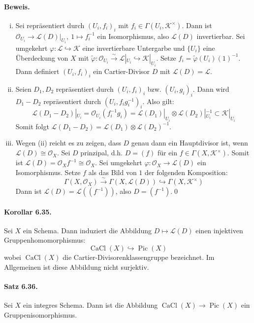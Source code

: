 \paragraph{Beweis.} \begin{enumerate}[(i)]
\item Sei repräsentiert durch $(U_i,f_i)_i$ mit $f_i\in\Gamma(U_i,\mathcal{K}^\times)$. Dann ist $\mathcal{O}_{U_i}\to\mathcal{L}(D)|_{U_i},\ 1\mapsto f_i^{-1}$ ein Isomorphismus, also $\mathcal{L}(D)$ invertierbar. Sei umgekehrt $\varphi:\mathcal{L}\hookrightarrow\mathcal{K}$ eine invertierbare Untergarbe und $\{U_i\}$ eine Überdeckung von $X$ mit $\tilde{\varphi}:\mathcal{O}_{U_i}\stackrel{\sim}{\to}\mathcal{L}|_{U_i}\hookrightarrow\mathcal{K}|_{U_i}$. Setze $f_i=\tilde{\varphi}(U_i)(1)^{-1}$. Dann definiert $(U_i,f_i)_i$ ein Cartier-Divisor $D$ mit $\mathcal{L}(D)=\mathcal{L}$.
\item Seien $D_1, D_2$ repräsentiert durch $(U_i,f_i)_i$ bzw. $(U_i,g_i)_i$. Dann wird $D_1-D_2$ repräsentiert durch $(U_i,f_ig_i^{-1})_i$. Also gilt:
\[\mathcal{L}(D_1-D_2)|_{U_i}=\mathcal{O}_{U_i}(f_i^{-1}g_i)=\mathcal{L}(D_1)|_{U_i}\otimes \mathcal{L}(D_2)|_{U_i}^{-1}\subset\mathcal{K}|_{U_i} \]
Somit folgt $\mathcal{L}(D_1-D_2)=\mathcal{L}(D_1)\otimes\mathcal{L}(D_2)^{-1}$.
\item Wegen (ii) reicht es zu zeigen, dass $D$ genau dann ein Hauptdivisor ist, wenn $\mathcal{L}(D)\cong\mathcal{O}_X$. Sei $D$ prinzipal, d.h. $D=(f)$ für ein $f\in\Gamma(X,\mathcal{K}^\times)$. Somit ist $\mathcal{L}(D)=\mathcal{O}_Xf^{-1}\cong\mathcal{O}_X$. Sei umgekehrt $\varphi:\mathcal{O}_X\to\mathcal{L}(D)$ ein Isomorphismus. Setze $f$ als das Bild von $1$ der folgenden Komposition:
\[\Gamma(X,\mathcal{O}_X)\stackrel{\sim}{\to} \Gamma(X,\mathcal{L}(D))\hookrightarrow\Gamma(X,\mathcal{K}^\times) \]
Dann ist $\mathcal{L}(D)=\mathcal{L}((f^{-1}))$, also $D=(f^{-1})$.\qed
\end{enumerate}

\paragraph{Korollar 6.35.}\label{6.35} Sei $X$ ein Schema. Dann induziert die Abbildung $D\mapsto\mathcal{L}(D)$ einen injektiven Gruppenhomomorphismus:
\[\operatorname{CaCl}(X)\hookrightarrow\operatorname{Pic}(X)\]
wobei $\operatorname{CaCl}(X)$ die Cartier-Divisorenklassengruppe bezeichnet. Im Allgemeinen ist diese Abbildung nicht surjektiv.

\paragraph{Satz 6.36.}\label{6.36} Sei $X$ ein integres Schema. Dann ist die Abbildung $\operatorname{CaCl}(X)\to\operatorname{Pic}(X)$ ein Gruppenisomorphismus.

